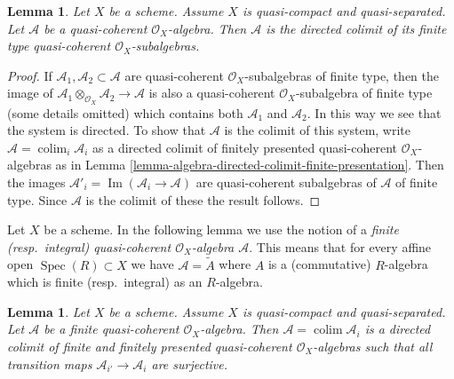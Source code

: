 \documentclass{stacks-project}
\theoremstyle{plain}
\newtheorem{lemma}[subsection]{Lemma}
\theoremstyle{definition}
\theoremstyle{remark}
\numberwithin{equation}{subsection}
\def\colim{\mathop{\mathrm{colim}}\nolimits}
\def\Spec{\mathop{\mathrm{Spec}}}
\def\Im{\mathop{\mathrm{Im}}}
\begin{document}
\begin{lemma}
\label{lemma-algebra-directed-colimit-finite-type}
Let $X$ be a scheme. Assume $X$ is quasi-compact and quasi-separated.
Let $\mathcal{A}$ be a quasi-coherent $\mathcal{O}_X$-algebra.
Then $\mathcal{A}$ is the directed colimit of its finite type
quasi-coherent $\mathcal{O}_X$-subalgebras.
\end{lemma}

\begin{proof}
If $\mathcal{A}_1, \mathcal{A}_2 \subset \mathcal{A}$ are
quasi-coherent $\mathcal{O}_X$-subalgebras of finite type, then the image of
$\mathcal{A}_1 \otimes_{\mathcal{O}_X} \mathcal{A}_2 \to \mathcal{A}$
is also a quasi-coherent $\mathcal{O}_X$-subalgebra of finite type
(some details omitted) which contains both $\mathcal{A}_1$ and $\mathcal{A}_2$.
In this way we see that the system is directed.
To show that $\mathcal{A}$ is the colimit of this system, write
$\mathcal{A} = \colim_i \mathcal{A}_i$ as a directed
colimit of finitely presented quasi-coherent $\mathcal{O}_X$-algebras as in
Lemma \ref{lemma-algebra-directed-colimit-finite-presentation}.
Then the images $\mathcal{A}'_i = \Im(\mathcal{A}_i \to \mathcal{A})$ are
quasi-coherent subalgebras of $\mathcal{A}$ of finite type. Since
$\mathcal{A}$ is the colimit of these the result follows.
\end{proof}

\noindent
Let $X$ be a scheme. In the following lemma we use the notion
of a {\it finite (resp.\ integral) quasi-coherent
$\mathcal{O}_X$-algebra $\mathcal{A}$}. This means that for every
affine open $\Spec(R) \subset X$ we have
$\mathcal{A} = \widetilde{A}$ where $A$ is a (commutative) $R$-algebra
which is finite (resp.\ integral) as an $R$-algebra.

\begin{lemma}
\label{lemma-finite-algebra-directed-colimit-finite-finitely-presented}
Let $X$ be a scheme. Assume $X$ is quasi-compact and quasi-separated.
Let $\mathcal{A}$ be a finite quasi-coherent $\mathcal{O}_X$-algebra.
Then $\mathcal{A} = \colim \mathcal{A}_i$ is a directed colimit of finite
and finitely presented quasi-coherent $\mathcal{O}_X$-algebras
such that all transition maps $\mathcal{A}_{i'} \to \mathcal{A}_i$
are surjective.
\end{lemma}
\end{document}
